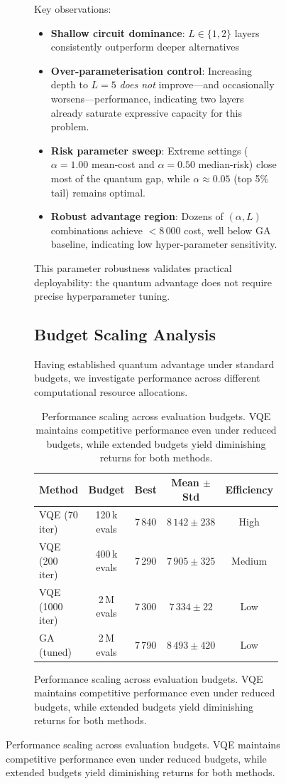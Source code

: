 \begin{figure}[htb]
\begin{figure}[htb]
Key observations:
\begin{itemize}[nosep]
    \item \textbf{Shallow circuit dominance}: $L \in \{1, 2\}$ layers consistently outperform deeper alternatives
    \item \textbf{Over-parameterisation control}: Increasing depth to $L = 5$ \emph{does not} improve---and occasionally worsens---performance, indicating two layers already saturate expressive capacity for this problem.
    \item \textbf{Risk parameter sweep}: Extreme settings ($\alpha = 1.00$ mean-cost and $\alpha = 0.50$ median-risk) close most of the quantum gap, while $\alpha \approx 0.05$ (top 5\% tail) remains optimal.
    \item \textbf{Robust advantage region}: Dozens of $(\alpha, L)$ combinations achieve $<8\,000$ cost, well below GA baseline, indicating low hyper-parameter sensitivity.
\end{itemize}

This parameter robustness validates practical deployability: the quantum advantage does not require precise hyperparameter tuning.

\subsection{Budget Scaling Analysis}

Having established quantum advantage under standard budgets, we investigate performance across different computational resource allocations.


\begin{table}[htb]
    \centering
    \caption{Performance scaling across evaluation budgets. VQE maintains competitive performance even under reduced budgets, while extended budgets yield diminishing returns for both methods.}
    \label{tab:budget_scaling}
    \begin{tabular}{lcccc}
        \toprule
        Method & Budget & Best & Mean $\pm$ Std & Efficiency \\
        \midrule
        VQE (70 iter) & 120\,k evals & 7\,840 & $8\,142 \pm 238$ & High \\
        VQE (200 iter) & 400\,k evals & 7\,290 & $7\,905 \pm 325$ & Medium \\
        VQE (1000 iter) & 2\,M evals & 7\,300 & $7\,334 \pm 22$ & Low \\
        GA (tuned) & 2\,M evals & 7\,790 & $8\,493 \pm 420$ & Low \\
        \bottomrule
    \end{tabular}
\end{table}


\end{figure}
\end{figure}
